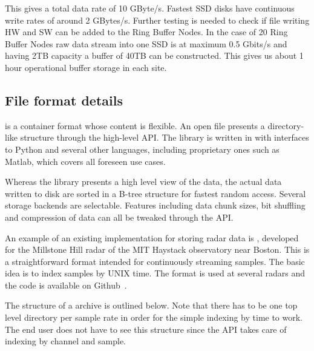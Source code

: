 \documentclass[12pt,a4paper]{article}
\begin{document}
This gives a total data rate of 10 GByte/s. Fastest SSD disks have continuous write rates of around 2 GBytes/s. Further testing is needed to check if file writing HW and SW can be added to the Ring Buffer Nodes. In the case of 20 Ring Buffer Nodes raw data stream into one SSD is at maximum 0.5 Gbits/s and having 2TB capacity a buffer of 40TB can be constructed. This gives us about 1 hour operational buffer storage in each site.  

\subsection{File format details}

\HDF is a container format whose content is flexible. An open \HDF file presents a directory-like structure through the high-level API. The library is written in \CP with interfaces to Python and several other languages, including proprietary ones such as Matlab, which covers all foreseen \ED use cases. 

Whereas the \HDF library presents a high level view of the data, the actual data written to disk are sorted in a B-tree structure for fastest random access. Several storage backends are selectable. Features including data chunk sizes, bit shuffling and compression of data can all be tweaked through the API.

An example of an existing \HDF implementation for storing radar data is \DRF, developed for the Millstone Hill radar of the MIT Haystack observatory near Boston. This is a straightforward \HDF format intended for continuously streaming samples.  The basic idea is to index samples by UNIX time. The format is used at several radars and the code is available on Github~\cite{drf}.

The structure of a \DRF archive is outlined below.  Note that there has to be one top level directory per sample rate in order for the simple indexing by time to work. The end user does not have to see this structure since the API takes care of indexing by channel and sample.
\end{document}
